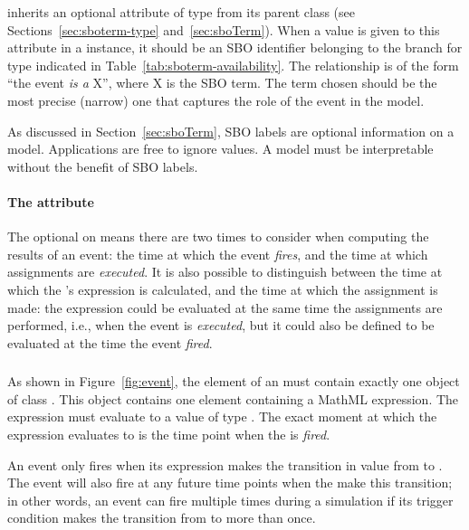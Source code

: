 \Event  inherits an optional 
attribute of type  from its parent
class \SBase (see Sections~\ref{sec:sboterm-type}
and~\ref{sec:sboTerm}).  When a value is given to this
attribute in a  \Event instance, it should be an
SBO identifier belonging to the branch for type  \Event
indicated in Table~\ref{tab:sboterm-availability}.  The relationship is
of the form ``the event \emph{is a} X'', where X is
the SBO term.  The term chosen should be the most precise (narrow)
one that captures the role of the event  in the model.

As discussed in Section~\ref{sec:sboTerm}, SBO labels are optional
information on a model.  Applications are free to ignore
 values.  A model must be interpretable without the
benefit of SBO labels.



\paragraph{The  attribute}
\label{sec:event-usevaluesfromtriggertime}

The optional \Delay on \Event means there are two times to
consider when computing the results of an event: the time at which
the event \emph{fires}, and the time at which assignments are
\emph{executed}.  It is also possible to distinguish between the
time at which the \EventAssignment's expression is calculated, and
the time at which the assignment is made: the expression could be
evaluated at the same time the assignments are
performed, i.e., when the event is \emph{executed}, but it could
also be defined to be evaluated at the time the event
\emph{fired}.


\subsubsection{}
\label{sec:trigger}
\label{sec:event-trigger}

As shown in Figure~\ref{fig:event}, the  element of
an \Event must contain exactly one object of class \Trigger.  This
object contains one  element containing a MathML
expression.  The expression must evaluate to a value of type
.  The exact moment at which the expression
evaluates to  is the time point when the \Event is
\emph{fired}.

An event only fires when its \Trigger expression makes the
transition in value from  to .  The event
will also fire at any future time points when the 
make this transition; in other words, an event can fire multiple
times during a simulation if its trigger condition makes the
transition from  to  more than once.

